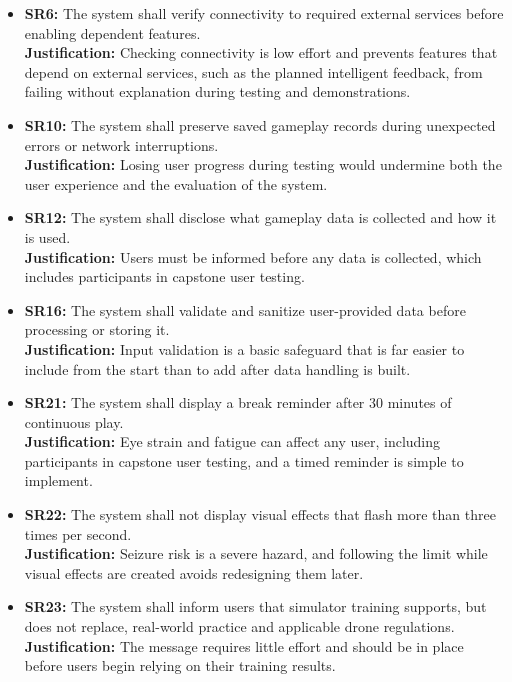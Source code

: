 \documentclass{article}
\newcommand{\reqref}[1]{#1}
\begin{document}
\begin{itemize}
    \item \textbf{\reqref{SR6}:} The system shall verify connectivity to required external services before enabling dependent features.\\
    \textbf{Justification:} Checking connectivity is low effort and prevents features that depend on external services, such as the planned intelligent feedback, from failing without explanation during testing and demonstrations.

    \item \textbf{\reqref{SR10}:} The system shall preserve saved gameplay records during unexpected errors or network interruptions.\\
    \textbf{Justification:} Losing user progress during testing would undermine both the user experience and the evaluation of the system.

    \item \textbf{\reqref{SR12}:} The system shall disclose what gameplay data is collected and how it is used.\\
    \textbf{Justification:} Users must be informed before any data is collected, which includes participants in capstone user testing.

    \item \textbf{\reqref{SR16}:} The system shall validate and sanitize user-provided data before processing or storing it.\\
    \textbf{Justification:} Input validation is a basic safeguard that is far easier to include from the start than to add after data handling is built.

    \item \textbf{\reqref{SR21}:} The system shall display a break reminder after 30 minutes of continuous play.\\
    \textbf{Justification:} Eye strain and fatigue can affect any user, including participants in capstone user testing, and a timed reminder is simple to implement.

    \item \textbf{\reqref{SR22}:} The system shall not display visual effects that flash more than three times per second.\\
    \textbf{Justification:} Seizure risk is a severe hazard, and following the limit while visual effects are created avoids redesigning them later.

    \item \textbf{\reqref{SR23}:} The system shall inform users that simulator training supports, but does not replace, real-world practice and applicable drone regulations.\\
    \textbf{Justification:} The message requires little effort and should be in place before users begin relying on their training results.


\end{itemize}
\end{document}
